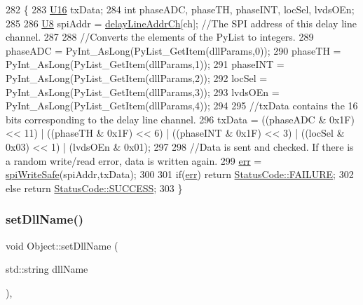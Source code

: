 \begin{DoxyCode}
282 \{                            
283     \hyperlink{ICECALv3_8h_adf928e51a60dba0df29d615401cc55a8}{U16} txData;
284     \textcolor{keywordtype}{int} phaseADC, phaseTH, phaseINT, locSel, lvdsOEn;
285 
286     \hyperlink{ICECALv3_8h_a3cb25ca6f51f003950f9625ff05536fc}{U8} spiAddr = \hyperlink{ICECALv3_8h_a848408b773702d268053cb49d205e097}{delayLineAddrCh}[ch];          \textcolor{comment}{//The SPI address of this delay line
       channel.}
287 
288     \textcolor{comment}{//Converts the elements of the PyList to integers.}
289     phaseADC = PyInt\_AsLong(PyList\_GetItem(dllParams,0));
290     phaseTH  = PyInt\_AsLong(PyList\_GetItem(dllParams,1));
291     phaseINT = PyInt\_AsLong(PyList\_GetItem(dllParams,2));
292     locSel   = PyInt\_AsLong(PyList\_GetItem(dllParams,3));
293     lvdsOEn  = PyInt\_AsLong(PyList\_GetItem(dllParams,4));
294 
295     \textcolor{comment}{//txData contains the 16 bits corresponding to the delay line channel.}
296     txData =  ((phaseADC & 0x1F) << 11) | ((phaseTH & 0x1F) << 6) | ((phaseINT & 0x1F) << 3) | ((locSel & 
      0x03) << 1) | (lvdsOEn & 0x01);
297 
298     \textcolor{comment}{//Data is sent and checked. If there is a random write/read error, data is written again.}
299     \hyperlink{classICECALv3_ad8989925ee5b3ff322d863ce6aaff0bd}{err} = \hyperlink{classICECALv3_aa0b8358ea0be8e47a8aded5e1551787f}{spiWriteSafe}(spiAddr,txData);  
300 
301     \textcolor{keywordflow}{if}(\hyperlink{classICECALv3_ad8989925ee5b3ff322d863ce6aaff0bd}{err}) \textcolor{keywordflow}{return} \hyperlink{classStatusCode_a6f565cbeadc76d14c72f047e5e85eb4ba3da73d4c469762eb9d3c960368252b26}{StatusCode::FAILURE};
302     \textcolor{keywordflow}{else}        \textcolor{keywordflow}{return} \hyperlink{classStatusCode_a6f565cbeadc76d14c72f047e5e85eb4badd0da38d3ba0d922efd1f4619bc37ad8}{StatusCode::SUCCESS};
303 \}
\end{DoxyCode}
\mbox{\label{classObject_a870c5af919958c2136623b2d7816d123}} 
\subsubsection{\texorpdfstring{set\+Dll\+Name()}{setDllName()}}
{\footnotesize\ttfamily void Object\+::set\+Dll\+Name (\begin{DoxyParamCaption}\item[{std\+::string}]{dll\+Name }\end{DoxyParamCaption})\hspace{0.3cm}{\ttfamily [inline]}, {\ttfamily [inherited]}}


